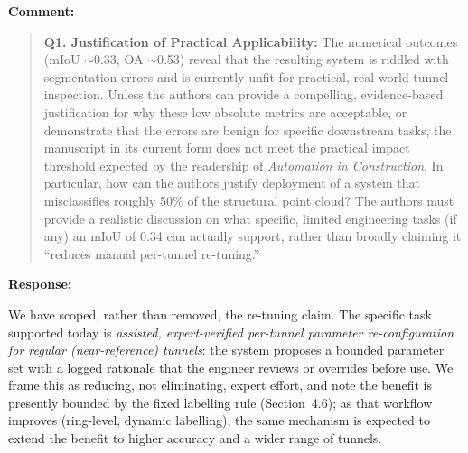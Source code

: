 \documentclass[11pt,a4paper]{article}
\newenvironment{commentblock}{%
  \par\smallskip\noindent\textbf{Comment:}\par
  \begin{quote}\itshape\color{black}
}{%
  \end{quote}\smallskip
}
\newenvironment{responseblock}{%
  \par\smallskip\noindent\textbf{Response:}\par
  \begingroup\color{responsegreen}
}{%
  \endgroup\smallskip
}
\begin{document}
\begin{commentblock}
\textbf{Q1. Justification of Practical Applicability:} The numerical outcomes (mIoU $\sim$0.33, OA $\sim$0.53) reveal that the resulting system is riddled with segmentation errors and is currently unfit for practical, real-world tunnel inspection. Unless the authors can provide a compelling, evidence-based justification for why these low absolute metrics are acceptable, or demonstrate that the errors are benign for specific downstream tasks, the manuscript in its current form does not meet the practical impact threshold expected by the readership of \emph{Automation in Construction}. In particular, how can the authors justify deployment of a system that misclassifies roughly 50\% of the structural point cloud? The authors must provide a realistic discussion on what specific, limited engineering tasks (if any) an mIoU of 0.34 can actually support, rather than broadly claiming it ``reduces manual per-tunnel re-tuning.''
\end{commentblock}

\begin{responseblock}
We have scoped, rather than removed, the re-tuning claim. The specific task supported today is \emph{assisted, expert-verified per-tunnel parameter re-configuration for regular (near-reference) tunnels}: the system proposes a bounded parameter set with a logged rationale that the engineer reviews or overrides before use. We frame this as reducing, not eliminating, expert effort, and note the benefit is presently bounded by the fixed labelling rule (Section~4.6); as that workflow improves (ring-level, dynamic labelling), the same mechanism is expected to extend the benefit to higher accuracy and a wider range of tunnels.
\end{responseblock}
\end{document}
